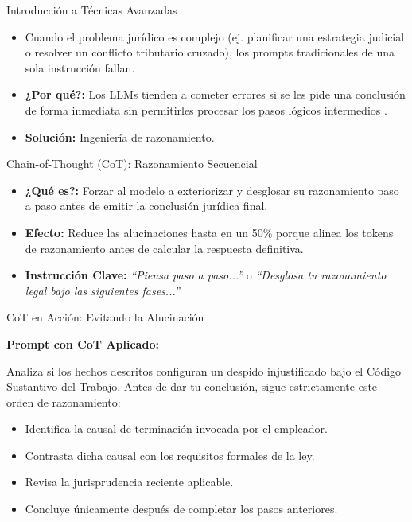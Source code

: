 \documentclass[aspectratio=169]{beamer}
\begin{document}
\begin{frame}[fragile]{Introducción a Técnicas Avanzadas}


\begin{itemize}
  \item Cuando el problema jurídico es complejo (ej. planificar una estrategia judicial o resolver un conflicto tributario cruzado), los prompts tradicionales de una sola instrucción fallan.
  \item \textbf{¿Por qué?:} Los LLMs tienden a cometer errores si se les pide una conclusión de forma inmediata sin permitirles procesar los pasos lógicos intermedios \cite{openai2023}.
  \item \textbf{Solución:} Ingeniería de razonamiento.
\end{itemize}
\end{frame}



\begin{frame}[fragile]{Chain-of-Thought (CoT): Razonamiento Secuencial}


\begin{itemize}
  \item \textbf{¿Qué es?:} Forzar al modelo a exteriorizar y desglosar su razonamiento paso a paso antes de emitir la conclusión jurídica final.
  \item \textbf{Efecto:} Reduce las alucinaciones hasta en un 50\% porque alinea los tokens de razonamiento antes de calcular la respuesta definitiva.
  \item \textbf{Instrucción Clave:} \textit{``Piensa paso a paso...''} o \textit{``Desglosa tu razonamiento legal bajo las siguientes fases...''}
\end{itemize}
\end{frame}



\begin{frame}[fragile]{CoT en Acción: Evitando la Alucinación}


\textbf{Prompt con CoT Aplicado:}

Analiza si los hechos descritos configuran un despido injustificado bajo el Código Sustantivo del Trabajo.
Antes de dar tu conclusión, sigue estrictamente este orden de razonamiento:

\begin{itemize}
  \item Identifica la causal de terminación invocada por el empleador.
  \item Contrasta dicha causal con los requisitos formales de la ley.
  \item Revisa la jurisprudencia reciente aplicable.
  \item Concluye únicamente después de completar los pasos anteriores.
\end{itemize}
\end{frame}
\end{document}

